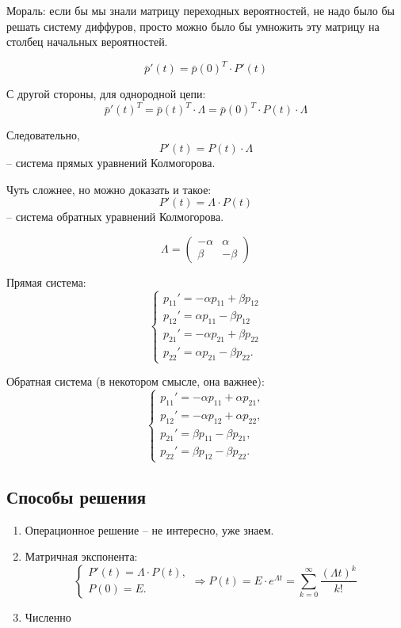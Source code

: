 Мораль: если бы мы знали матрицу переходных вероятностей, не надо было бы 
решать систему диффуров, просто можно было бы умножить эту матрицу на столбец
начальных вероятностей.

\begin{corollary}
  \[
    \bar{p}'(t) = \bar{p}(0)^T \cdot P'(t)
  \]

  С другой стороны, для однородной цепи:
  \[
    \bar{p}'(t)^T = \bar{p}(t)^T \cdot \Lambda = \bar{p}(0)^T \cdot P(t) \cdot \Lambda
  \]

  Следовательно, 
  \[
    P'(t) = P(t) \cdot \Lambda
  \]
  -- система прямых уравнений Колмогорова.

  Чуть сложнее, но можно доказать и такое:
  \[
    P'(t) = \Lambda \cdot P(t)
  \]
  -- система обратных уравнений Колмогорова.
\end{corollary}

\begin{ex}
  \[
    \Lambda = \begin{pmatrix}
      -\alpha & \alpha \\
      \beta & - \beta
    \end{pmatrix} 
  \]

  Прямая система:
  \[
    \begin{cases}
      p_{11}' = - \alpha p_{11} + \beta p_{12} \\
      p_{12}' = \alpha p_{11} - \beta p_{12} \\
      p_{21}' = -\alpha p_{21} + \beta p_{22} \\
      p_{22}' = \alpha p_{21} - \beta p_{22}.
    \end{cases}
  \]

  Обратная система (в некотором смысле, она важнее):
  \[
    \begin{cases}
      p_{11}' = - \alpha p_{11} + \alpha p_{21}, \\
      p_{12}' = -\alpha p_{12} + \alpha p_{22}, \\
      p_{21}' = \beta p_{11} - \beta p_{21}, \\
      p_{22}' = \beta p_{12} - \beta p_{22}.
    \end{cases}
  \]
\end{ex}

\subsection{Способы решения}

\begin{enumerate}
  \item Операционное решение -- не интересно, уже знаем.
  \item Матричная экспонента:
    \[
      \begin{cases}
        P'(t) = \Lambda \cdot P(t), \\
        P(0) = E.
      \end{cases}
      \Rightarrow
      P(t) = E \cdot e^{\Lambda t} = \sum_{k=0}^\infty \dfrac{(\Lambda t)^k}{k!}
    \]
  \item Численно
\end{enumerate}

